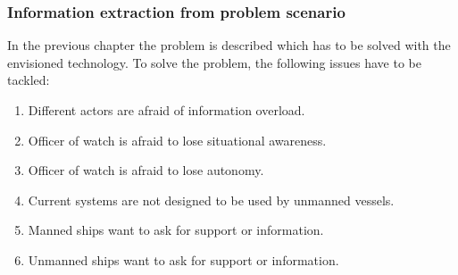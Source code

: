 \subsubsection{Information extraction from problem scenario}
In the previous chapter the problem is described which has to be solved with the envisioned technology. To solve the problem, the following issues have to be tackled:
\begin{enumerate}
	\item Different actors are afraid of information overload.
	\item Officer of watch is afraid to lose situational awareness.
	\item Officer of watch is afraid to lose autonomy.
	\item Current systems are not designed to be used by unmanned vessels.
	\item Manned ships want to ask for support or information.
	\item Unmanned ships want to ask for support or information.
\end{enumerate}

